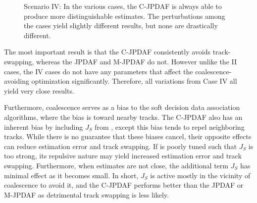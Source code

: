 \begin{figure}
{
\centerline{
	}
\centerline{
	}
\centerline{
	}
}
\caption{Scenario IV: In the various cases, the C-JPDAF is always able to produce more distinguishable estimates.
The perturbations among the cases yield slightly different results, but none are drastically different.
}\label{fig:IV}
\end{figure}

The most important result is that the C-JPDAF consistently avoids track-swapping, whereas the JPDAF and M-JPDAF do not.
However unlike the II cases, the IV cases do not have any parameters that affect the coalescence-avoiding optimization significantly.
Therefore, all variations from Case IV all yield very close results.

Furthermore, coalescence serves as a bias to the soft decision data association algorithms, where the bias is toward nearby tracks. The C-JPDAF also has an inherent bias by including $J_S$ from , except this bias tends to repel neighboring tracks. While there is no guarantee that these biases cancel, their opposite effects can reduce estimation error and track swapping. If  is poorly tuned such that $J_S$ is too strong, its repulsive nature may yield increased estimation error and track swapping.
Furthermore, when estimates are not close, the additional term $J_S$ has minimal effect as it becomes small.
In short, $J_S$ is active mostly in the vicinity of coalescence to avoid it, and the C-JPDAF performs better than the JPDAF or M-JPDAF as detrimental track swapping is less likely.

